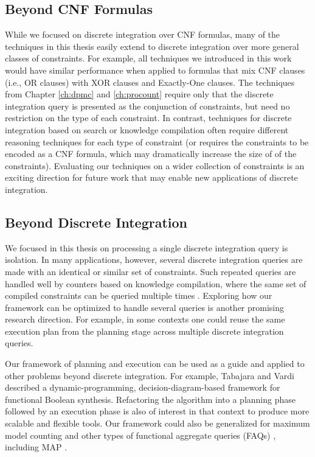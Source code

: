 \subsection{Beyond CNF Formulas}
While we focused on discrete integration over CNF formulas, many of the techniques in this thesis easily extend to discrete integration over more general classes of constraints.
For example, all techniques we introduced in this work would have similar performance when applied to formulas that mix CNF clauses (i.e., OR clauses) with XOR clauses and Exactly-One clauses. %
The techniques from Chapter \ref{ch:dpmc} and \ref{ch:procount} require only that the discrete integration query is presented as the conjunction of constraints, but need no restriction on the type of each constraint. 
In contrast, techniques for discrete integration based on search or knowledge compilation often require different reasoning techniques for each type of constraint (or requires the constraints to be encoded as a CNF formula, which may dramatically increase the size of of the constraints).
Evaluating our techniques on a wider collection of constraints is an exciting direction for future work that may enable new applications of discrete integration.


\subsection{Beyond Discrete Integration}
We focused in this thesis on processing a single discrete integration query is isolation. 
In many applications, however, several discrete integration queries are made with an identical or similar set of constraints. %
Such repeated queries are handled well by counters based on knowledge compilation, where the same set of compiled constraints can be queried multiple times \cite{koriche2013knowledge,LM17,darwiche2004new,OD15}.
Exploring how our framework can be optimized to handle several queries is another promising research direction.
For example, in some contexts one could reuse the same execution plan from the planning stage across multiple discrete integration queries.

Our framework of planning and execution can be used as a guide and applied to other problems beyond discrete integration.
For example, Tabajara and Vardi \cite{tabajara2017factored} described a dynamic-programming, decision-diagram-based framework for functional Boolean synthesis.
Refactoring the algorithm into a planning phase followed by an execution phase is also of interest in that context to produce more scalable and flexible tools.
Our framework could also be generalized for maximum model counting \cite{fremont2017maximum} and other types of functional aggregate queries (FAQs) \cite{KNR16}, including MAP \cite{murphy2012machine,maua2015complexity,xue2016solving}.
